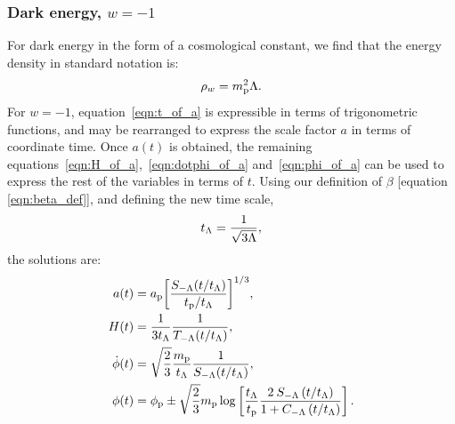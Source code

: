 \subsubsection{Dark energy, \(w=-1\)}
For dark energy in the form of a cosmological constant, we find that the energy density in standard notation is:
%
\begin{equation}
  \rho_w = m_{\mathrm{p}}^2\Lambda.
\end{equation}
%
For \(w=-1\), equation~\eqref{eqn:t_of_a} is expressible in terms of trigonometric functions, and may be rearranged to express the scale factor \(a\) in terms of coordinate time. Once \(a(t)\) is obtained, the remaining equations~\eqref{eqn:H_of_a},~\eqref{eqn:dotphi_of_a} and~\eqref{eqn:phi_of_a} can be used to express the rest of the variables in terms of \(t\). Using our definition of \(\beta\) [equation \nolinebreak\ref{eqn:beta_def}], and defining the new time scale,
%
\begin{equation}
  t_\mathrm{\Lambda} = \frac{1}{\sqrt{3\Lambda}},
  \label{eqn:tl}
\end{equation}
%
the solutions are:
%
\begin{align}
  a(t)
  &=
  a_{\mathrm{p}}{\left[{\frac {S_{-\Lambda}(t/t_\mathrm{\Lambda})}{t_{\mathrm{p}}/t_\mathrm{\Lambda}}}\right]}^{1/3},
  \\
  H(t)
  &=
  \frac{1}{3t_\mathrm{\Lambda}}\frac{1}{T_{-\Lambda}(t/t_\mathrm{\Lambda})},
  \\
  \dot{\phi}(t)
  &=
  \sqrt{\frac{2}{3}}\frac{m_{\mathrm{p}}}{t_\mathrm{\Lambda}}\frac{1}{S_{-\Lambda}(t/t_\mathrm{\Lambda})},
  \\
  \phi(t)
  &=
  \phi_{\mathrm{p}} \pm \sqrt{\frac{2}{3}}m_{\mathrm{p}}
  \log\left[
  \frac{t_\mathrm{\Lambda}}{t_{\mathrm{p}}} 
  \frac 
  {2\: S_{-\Lambda} \left( t/t_\mathrm{\Lambda} \right) }
  {1 + C_{-\Lambda} \left( t/t_\mathrm{\Lambda} \right)}  
  \right].
\end{align}
%

